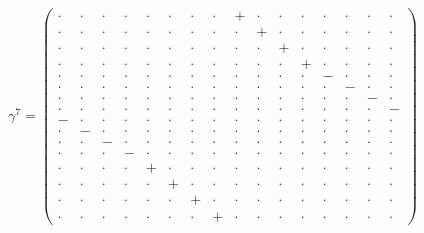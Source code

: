 \documentclass[
  10pt,
]{article}
\begin{document}
\[\gamma^7=\left(\begin{smallmatrix} \cdot & \cdot & \cdot & \cdot & \cdot & \cdot & \cdot & \cdot & + & \cdot & \cdot & \cdot & \cdot & \cdot & \cdot & \cdot \\ \cdot & \cdot & \cdot & \cdot & \cdot & \cdot & \cdot & \cdot & \cdot & + & \cdot & \cdot & \cdot & \cdot & \cdot & \cdot \\ \cdot & \cdot & \cdot & \cdot & \cdot & \cdot & \cdot & \cdot & \cdot & \cdot & + & \cdot & \cdot & \cdot & \cdot & \cdot \\ \cdot & \cdot & \cdot & \cdot & \cdot & \cdot & \cdot & \cdot & \cdot & \cdot & \cdot & + & \cdot & \cdot & \cdot & \cdot \\ \cdot & \cdot & \cdot & \cdot & \cdot & \cdot & \cdot & \cdot & \cdot & \cdot & \cdot & \cdot & - & \cdot & \cdot & \cdot \\ \cdot & \cdot & \cdot & \cdot & \cdot & \cdot & \cdot & \cdot & \cdot & \cdot & \cdot & \cdot & \cdot & - & \cdot & \cdot \\ \cdot & \cdot & \cdot & \cdot & \cdot & \cdot & \cdot & \cdot & \cdot & \cdot & \cdot & \cdot & \cdot & \cdot & - & \cdot \\ \cdot & \cdot & \cdot & \cdot & \cdot & \cdot & \cdot & \cdot & \cdot & \cdot & \cdot & \cdot & \cdot & \cdot & \cdot & - \\ - & \cdot & \cdot & \cdot & \cdot & \cdot & \cdot & \cdot & \cdot & \cdot & \cdot & \cdot & \cdot & \cdot & \cdot & \cdot \\ \cdot & - & \cdot & \cdot & \cdot & \cdot & \cdot & \cdot & \cdot & \cdot & \cdot & \cdot & \cdot & \cdot & \cdot & \cdot \\ \cdot & \cdot & - & \cdot & \cdot & \cdot & \cdot & \cdot & \cdot & \cdot & \cdot & \cdot & \cdot & \cdot & \cdot & \cdot \\ \cdot & \cdot & \cdot & - & \cdot & \cdot & \cdot & \cdot & \cdot & \cdot & \cdot & \cdot & \cdot & \cdot & \cdot & \cdot \\ \cdot & \cdot & \cdot & \cdot & + & \cdot & \cdot & \cdot & \cdot & \cdot & \cdot & \cdot & \cdot & \cdot & \cdot & \cdot \\ \cdot & \cdot & \cdot & \cdot & \cdot & + & \cdot & \cdot & \cdot & \cdot & \cdot & \cdot & \cdot & \cdot & \cdot & \cdot \\ \cdot & \cdot & \cdot & \cdot & \cdot & \cdot & + & \cdot & \cdot & \cdot & \cdot & \cdot & \cdot & \cdot & \cdot & \cdot \\ \cdot & \cdot & \cdot & \cdot & \cdot & \cdot & \cdot & + & \cdot & \cdot & \cdot & \cdot & \cdot & \cdot & \cdot & \cdot \end{smallmatrix}\right)\]
\end{document}
